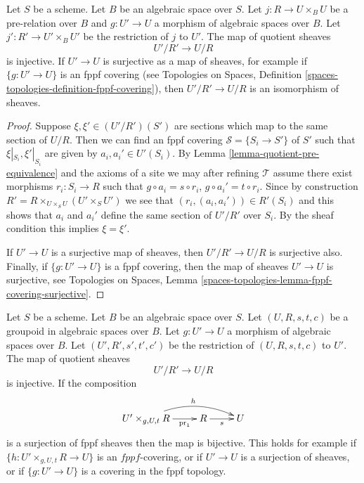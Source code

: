 \begin{lemma}
\label{lemma-quotient-pre-equivalence-relation-restrict}
Let $S$ be a scheme. Let $B$ be an algebraic space over $S$.
Let $j : R \to U\times_B U$ be a pre-relation over $B$
and $g : U' \to U$ a morphism of algebraic spaces over $B$.
Let $j' : R' \to U' \times_B U'$ be the restriction of $j$ to $U'$.
The map of quotient sheaves
$$
U'/R' \longrightarrow U/R
$$
is injective. If $U' \to U$ is surjective as a map of sheaves, for
example if $\{g : U' \to U\}$ is an fppf covering (see
Topologies on Spaces,
Definition \ref{spaces-topologies-definition-fppf-covering}),
then $U'/R' \to U/R$ is an isomorphism of sheaves.
\end{lemma}

\begin{proof}
Suppose $\xi, \xi' \in (U'/R')(S')$ are sections which
map to the same section of $U/R$.
Then we can find an fppf covering $\mathcal{S} = \{S_i \to S'\}$ of $S'$
such that $\xi|_{S_i}, \xi'|_{S_i}$ are given by $a_i, a_i' \in U'(S_i)$. By
Lemma \ref{lemma-quotient-pre-equivalence}
and the axioms of a site we may after refining
$\mathcal{T}$ assume there exist morphisms $r_i : S_i \to R$
such that $g \circ a_i = s \circ r_i$, $g \circ a_i' = t \circ r_i$.
Since by construction
$R' = R \times_{U \times_S U} (U' \times_S U')$
we see that $(r_i, (a_i, a_i')) \in R'(S_i)$ and this
shows that $a_i$ and $a_i'$ define the same section
of $U'/R'$ over $S_i$. By the sheaf condition this implies
$\xi = \xi'$.

\medskip\noindent
If $U' \to U$ is a surjective map of sheaves, then $U'/R' \to U/R$ is
surjective also. Finally, if $\{g : U' \to U\}$ is a fppf covering, then
the map of sheaves $U' \to U$ is surjective, see
Topologies on Spaces,
Lemma \ref{spaces-topologies-lemma-fppf-covering-surjective}.
\end{proof}

\begin{lemma}
\label{lemma-quotient-groupoid-restrict}
Let $S$ be a scheme. Let $B$ be an algebraic space over $S$.
Let $(U, R, s, t, c)$ be a groupoid in algebraic spaces over $B$.
Let $g : U' \to U$ a morphism of algebraic spaces over $B$.
Let $(U', R', s', t', c')$ be the restriction of $(U, R, s, t, c)$ to $U'$.
The map of quotient sheaves
$$
U'/R' \longrightarrow U/R
$$
is injective. If the composition
$$
\xymatrix{
U' \times_{g, U, t} R \ar[r]_-{\text{pr}_1} \ar@/^3ex/[rr]^h
& R \ar[r]_s & U
}
$$
is a surjection of fppf sheaves then the map is bijective.
This holds for example if $\{h : U' \times_{g, U, t} R \to U\}$ is an
$fppf$-covering, or if $U' \to U$ is a surjection of sheaves, or if
$\{g : U' \to U\}$ is a covering in the fppf topology.
\end{lemma}

